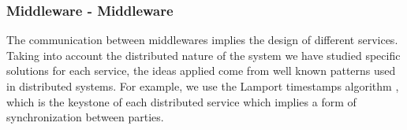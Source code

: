 \subsubsection{Middleware - Middleware}

The communication between middlewares implies the design of different
services. Taking into account the distributed nature of the system we have
studied specific solutions for each service, the ideas applied come from
well known patterns used in distributed systems.
For example, we use the Lamport timestamps algorithm \cite{Lamport:1978:TCO:359545.359563},
which is the keystone
of each distributed service which implies a form of synchronization
between parties.





